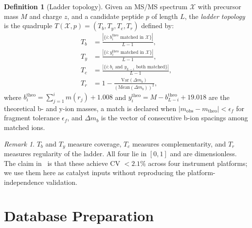 \documentclass[11pt,a4paper]{article}
\theoremstyle{definition}
\newtheorem{definition}[theorem]{Definition}
\theoremstyle{remark}
\newtheorem{remark}[theorem]{Remark}
\newcommand{\Spec}{\mathcal{X}}
\begin{document}
\begin{definition}[Ladder topology]
\label{def:topology}
Given an MS/MS spectrum $\Spec$ with precursor mass $M$ and charge $z$,
and a candidate peptide $p$ of length $L$, the \emph{ladder topology}
is the quadruple
$T(\Spec,p)=(T_b,T_y,T_c,T_r)$ defined by:
\begin{align}
  T_b &= \frac{|\{i : b_i^{\mathrm{theo}} \text{ matched in } \Spec\}|}{L-1},
  \label{eq:tb}\\[2pt]
  T_y &= \frac{|\{i : y_i^{\mathrm{theo}} \text{ matched in } \Spec\}|}{L-1},
  \label{eq:ty}\\[2pt]
  T_c &= \frac{|\{i : b_i \text{ and } y_{L-i} \text{ both matched}\}|}{L-1},
  \label{eq:tc}\\[2pt]
  T_r &= 1 - \frac{\mathrm{Var}(\Delta m_{b})}{(\mathrm{Mean}(\Delta m_{b}))^2},
  \label{eq:tr}
\end{align}
where $b_i^{\mathrm{theo}}=\sum_{j=1}^{i}m(r_j)+1.008$ and
$y_i^{\mathrm{theo}}=M-b_{L-i}^{\mathrm{theo}}+19.018$
are the theoretical b- and y-ion masses, a match is declared when
$|m_{\mathrm{obs}}-m_{\mathrm{theo}}|<\epsilon_f$ for fragment
tolerance $\epsilon_f$, and $\Delta m_b$ is the vector of consecutive
b-ion spacings among matched ions.
\end{definition}

\begin{remark}
$T_b$ and $T_y$ measure coverage, $T_c$ measures complementarity,
and $T_r$ measures regularity of the ladder. All four lie in $[0,1]$
and are dimensionless. The claim
in~\citet{sachikonye2025fragmentation} is that these achieve
CV $<2.1\%$ across four instrument platforms; we use them here as
catalyst inputs without reproducing the platform-independence validation.
\end{remark}

\section{Database Preparation}
\label{sec:database}
\end{document}
